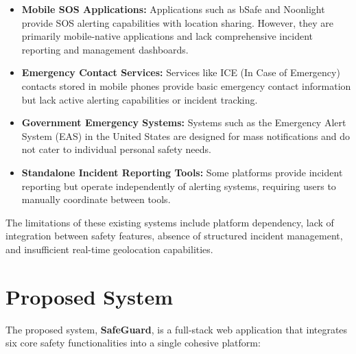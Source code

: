 \begin{itemize}
  \item \textbf{Mobile SOS Applications:} Applications such as bSafe and Noonlight provide SOS alerting capabilities with location sharing. However, they are primarily mobile-native applications and lack comprehensive incident reporting and management dashboards.

  \item \textbf{Emergency Contact Services:} Services like ICE (In Case of Emergency) contacts stored in mobile phones provide basic emergency contact information but lack active alerting capabilities or incident tracking.

  \item \textbf{Government Emergency Systems:} Systems such as the Emergency Alert System (EAS) in the United States are designed for mass notifications and do not cater to individual personal safety needs.

  \item \textbf{Standalone Incident Reporting Tools:} Some platforms provide incident reporting but operate independently of alerting systems, requiring users to manually coordinate between tools.
\end{itemize}

The limitations of these existing systems include platform dependency, lack of integration between safety features, absence of structured incident management, and insufficient real-time geolocation capabilities.

\section{Proposed System}

The proposed system, \textbf{SafeGuard}, is a full-stack web application that integrates six core safety functionalities into a single cohesive platform:

